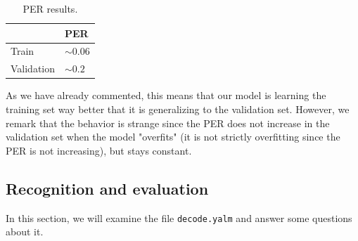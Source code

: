 \documentclass[a4paper]{article}
\def\inline{\lstinline[basicstyle=\ttfamily,keywordstyle={}]}
\begin{document}
\begin{itemize}
        \begin{table}[H]
          \centering
          \begin{tabular}{l|l}
                       & PER         \\ \hline
            Train      & $\sim 0.06$ \\
            Validation & $\sim 0.2$
          \end{tabular}
          \caption{PER results.}
        \end{table}

        As we have already commented, this means that our model is learning the training set way better that it is generalizing to the validation set. However, we remark that the behavior is strange since the PER does not increase in the validation set when the model "overfits" (it is not strictly overfitting since the PER is not increasing), but stays constant.
\end{itemize}

\subsection{Recognition and evaluation}

In this section, we will examine the file \inline{decode.yalm} and answer some questions about it.
\end{document}
